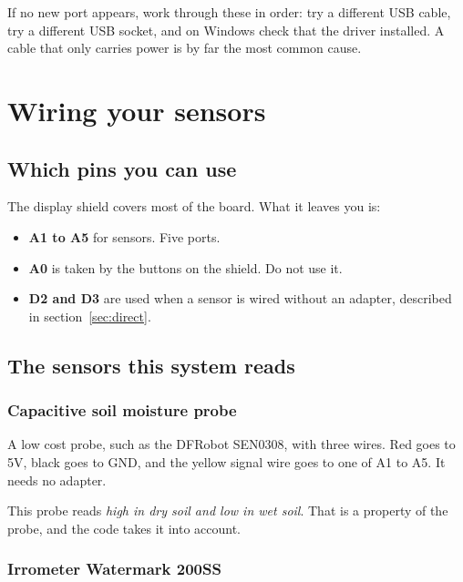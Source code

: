 \documentclass[11pt,a4paper]{article}
\newenvironment{caution}
  {\par\medskip\noindent
   \begin{lrbox}{\nfbox}\begin{minipage}{0.94\linewidth}\vspace{2pt}}
  {\vspace{2pt}\end{minipage}\end{lrbox}%
   \fcolorbox{warn}{white}{\usebox{\nfbox}}\par\medskip}
\begin{document}
\begin{caution}
If no new port appears, work through these in order: try a different USB cable,
try a different USB socket, and on Windows check that the driver installed. A
cable that only carries power is by far the most common cause.
\end{caution}

\section{Wiring your sensors}

\subsection{Which pins you can use}

The display shield covers most of the board. What it leaves you is:

\begin{itemize}
  \item \textbf{A1 to A5} for sensors. Five ports.
  \item \textbf{A0} is taken by the buttons on the shield. Do not use it.
  \item \textbf{D2 and D3} are used when a sensor is wired without an adapter,
        described in section~\ref{sec:direct}.
\end{itemize}

\subsection{The sensors this system reads}
\label{sec:sensors}

\subsubsection*{Capacitive soil moisture probe}

A low cost probe, such as the DFRobot SEN0308, with three wires. Red goes to
5V, black goes to GND, and the yellow signal wire goes to one of A1 to A5. It
needs no adapter.

This probe reads \emph{high in dry soil and low in wet soil}. That is a
property of the probe, and the code takes it into account.

\subsubsection*{Irrometer Watermark 200SS}
\end{document}
